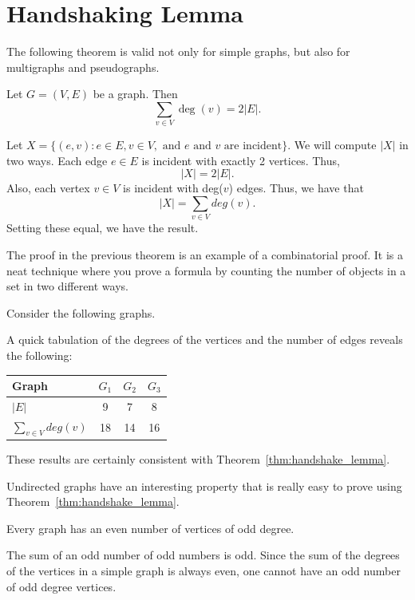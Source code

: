 \section{Handshaking Lemma}\label{sec:handshaking}
The following theorem is valid not only for simple graphs, 
but also for multigraphs and pseudographs.
\begin{thm}\label{thm:handshake_lemma}
Let $G=(V,E)$ be a  graph. Then $$ \sum _{v\in V} \deg(v) = 2|E|. $$
\begin{pf}
Let $X=\{(e,v) : e\in E, v\in V, \mbox{ and } e \mbox{ and } v \mbox{ are incident}\}$.
We will compute $|X|$ in two ways.
Each edge $e\in E$ is incident with exactly 2 vertices.  Thus, 
$$|X|=2 |E|.$$
Also, each vertex $v\in V$ is incident with deg($v$) edges. Thus, we
have that 
$${\displaystyle |X|=\sum_{v\in V} deg(v)}.$$
Setting these equal, we have the result.
\end{pf}
\end{thm}
The proof in the previous theorem is an example of a combinatorial proof. 
It is a neat technique where you prove a formula
by counting the number of objects in a set in two different ways. 

\begin{exa}
Consider the following graphs.
\begin{center}
\end{center}

A quick tabulation of the degrees of the vertices and the number of edges
reveals the following:
\begin{center}
\begin{tabular}{|l|c|c|c|}
\hline
Graph&$G_1$&$G_2$&$G_3$\\
\hline
\hline
$|E|$&9&7&8\\
\hline
${\displaystyle \sum_{v\in V} deg(v)}$&18&14&16\\
\hline
\end{tabular}
\end{center}
These results are certainly consistent with Theorem~\ref{thm:handshake_lemma}.
\end{exa}

Undirected graphs have an interesting property that is really easy to prove using 
Theorem~\ref{thm:handshake_lemma}.

\begin{cor}\label{cor:hand}
Every graph has an even number of vertices of odd degree.
\begin{pf}
The sum of an odd number of odd numbers is odd. Since the sum of
the degrees of the vertices in a simple graph is always even, one
cannot have an odd number of odd degree vertices.
\end{pf}
\end{cor}


